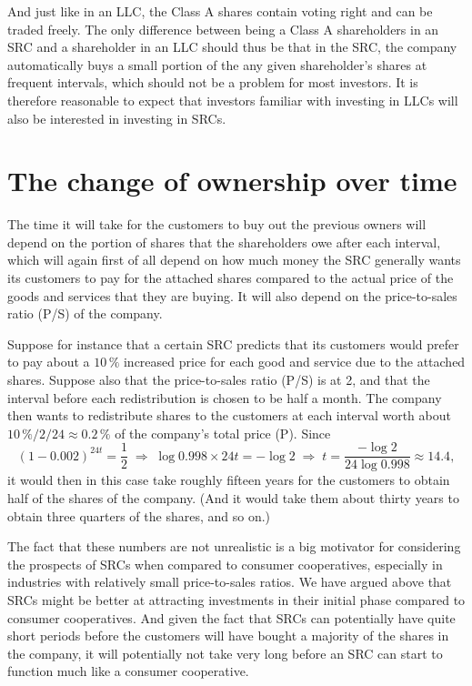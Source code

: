 \documentclass{article}
\begin{document}
And just like in an LLC, the Class A shares contain voting right and can be traded freely. The only difference between being a Class A shareholders in an SRC and a shareholder in an LLC should thus be that in the SRC, the company automatically buys a small portion of the any given shareholder's shares at frequent intervals, which should not be a problem for most investors. It is therefore reasonable to expect that investors familiar with investing in LLCs will also be interested in investing in SRCs. 



\section{The change of ownership over time}

The time it will take for the customers to buy out the previous owners will depend on the portion of shares that the shareholders owe after each interval, which will again first of all depend on how much money the SRC generally wants its customers to pay for the attached shares compared to the actual price of the goods and services that they are buying. It will also depend on the price-to-sales ratio (P/S) of the company. 

Suppose for instance that a certain SRC predicts that its customers would prefer to pay about a $10\, \%$ increased price for each good and service due to the attached shares. Suppose also that the price-to-sales ratio (P/S) is at 2, and that the interval before each redistribution is chosen to be half a month. The company then wants to redistribute shares to the customers at each interval worth about $10\, \% / 2 / 24 \approx 0.2\, \%$ of the company's total price (P).
Since
\[
	(1 - 0.002)^{24 t} = \frac{1}{2} 
	\;\Rightarrow\; 
	\log 0.998 \times 24 t = -\log 2 
	\;\Rightarrow\; 
	t = \frac{-\log 2}{24 \log 0.998} \approx 14.4,
\]
it would then in this case take roughly fifteen years for the customers to obtain half of the shares of the company. (And it would take them about thirty years to obtain three quarters of the shares, and so on.)

The fact that these numbers are not unrealistic is a big motivator for considering the prospects of SRCs when compared to consumer cooperatives, especially in industries with relatively small price-to-sales ratios. We have argued above that SRCs might be better at attracting investments in their initial phase compared to consumer cooperatives. And given the fact that SRCs can potentially have quite short periods before the customers will have bought a majority of the shares in the company, it will potentially not take very long before an SRC can start to function much like a consumer cooperative. 
\end{document}

